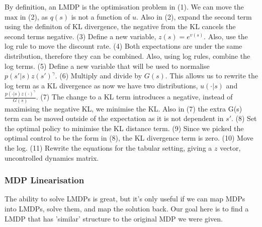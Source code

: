 By definition, an LMDP is the optimisation problem in (1). We can move the $\text{max}$ in (2), as $q(s)$ is not a function of $u$. Also in (2), expand the second term using the definiton of KL divergence, the negative from the KL cancels the second terms negative. (3) Define a new variable, $z(s) = e^{v(s)}$. Also, use the log rule to move the discount rate. (4) Both expectations are under the same distribution, therefore they can be combined. Also, using log rules, combine the log terms. (5) Define a new variable that will be used to normalise $p(s' | s)z(s')^{\gamma}$. (6) Multiply and divide by $G(s)$. This allows us to rewrite the log term as a KL divergence as now we have two distributions, $u(\cdot | s)$ and $\frac{p(\cdot | s)z(\cdot)^{\gamma}}{G(s)}$. (7) The change to a KL term introduces a negative, instead of maximising the negative KL, we minimise the KL. Also in (7) the extra G(s) term can be moved outside of the expectation as it is not dependent in $s'$. (8) Set the optimal policy to minimise the KL distance term. (9) Since we picked the optimal control to be the form in (8), the KL divergence term is zero. (10) Move the log. (11) Rewrite the equations for the tabular setting, giving a $z$ vector, uncontrolled dynamics matrix.

\subsubsection{MDP Linearisation}

The ability to solve LMDPs is great, but it's only useful if we can map MDPs into LMDPs, solve them, and map the solution back.
Our goal here is to find a LMDP that has 'similar' structure to the original MDP we were given. \footnotemark[1]



